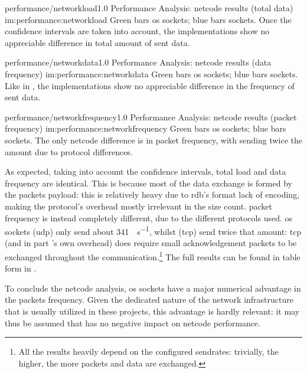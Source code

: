 \begin{image}
	{performance/networkload}{1.0}
	{Performance Analysis: \gls{netcode} results (total data)}
	{im:performance:networkload}
	{}
	{Green bars \gls{os} sockets; blue bars  sockets. Once the confidence intervals are taken into account, the implementations show no appreciable difference in total amount of sent data.}
\end{image}

\begin{image}
	{performance/networkdata}{1.0}
	{Performance Analysis: \gls{netcode} results (data frequency)}
	{im:performance:networkdata}
	{}
	{Green bars \gls{os} sockets; blue bars  sockets. Like in , the implementations show no appreciable difference in the frequency of sent data.}
\end{image}

\begin{image}
	{performance/networkfrequency}{1.0}
	{Performance Analysis: \gls{netcode} results (\gls{packet} frequency)}
	{im:performance:networkfrequency}
	{}
	{Green bars \gls{os} sockets; blue bars  sockets. The only \gls{netcode} difference is in \gls{packet} frequency, with  sending twice the amount due to protocol differences.}
\end{image}

As expected, taking into account the confidence intervals, total load and data frequency are identical. This is because most of the data exchange is formed by the \glspl{packet} \gls{payload}: this is relatively heavy due to \gls{rdb}'s format lack of encoding, making the protocol's overhead mostly irrelevant in the size count. \Gls{packet} frequency is instead completely different, due to the different protocols used. \gls{os} sockets (\gls{udp}) only send about \SI{341}{\packets\per\second}, whilst  (\gls{tcp}) send twice that amount: \gls{tcp} (and in part 's own overhead) does require small acknowledgement \glspl{packet} to be exchanged throughout the communication.\footnote{All the results heavily depend on the configured \glspl{sendrate}: trivially, the higher, the more \glspl{packet} and data are exchanged.} The full results can be found in table form in .

To conclude the \gls{netcode} analysis, \gls{os} sockets have a major numerical advantage in the \glspl{packet} frequency. Given the dedicated nature of the network infrastructure that is usually utilized in these projects, this advantage is hardly relevant: it may thus be assumed that  has no negative impact on \gls{netcode} performance.

